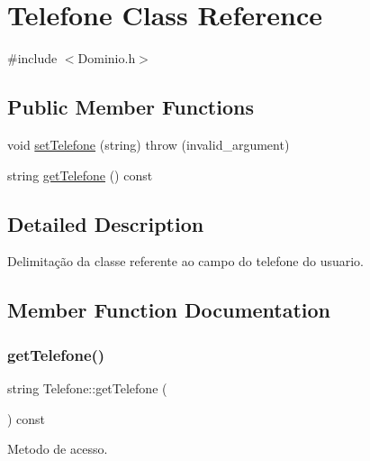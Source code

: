 \hypertarget{class_telefone}{}\section{Telefone Class Reference}
\label{class_telefone}


{\ttfamily \#include $<$Dominio.\+h$>$}

\subsection*{Public Member Functions}
\begin{DoxyCompactItemize}
\item 
void \hyperlink{class_telefone_a79516b37434ff927bd2a9bd66080a36d}{set\+Telefone} (string)  throw (invalid\+\_\+argument)
\item 
string \hyperlink{class_telefone_a64d1e99657fde65bb698ddcd56e7eb04}{get\+Telefone} () const
\end{DoxyCompactItemize}


\subsection{Detailed Description}
Delimitação da classe referente ao campo do telefone do usuario. 

\subsection{Member Function Documentation}
\mbox{\label{class_telefone_a64d1e99657fde65bb698ddcd56e7eb04}} 
\subsubsection{\texorpdfstring{get\+Telefone()}{getTelefone()}}
{\footnotesize\ttfamily string Telefone\+::get\+Telefone (\begin{DoxyParamCaption}{ }\end{DoxyParamCaption}) const\hspace{0.3cm}{\ttfamily [inline]}}

Metodo de acesso. \mbox{\label{class_telefone_a79516b37434ff927bd2a9bd66080a36d}} 
